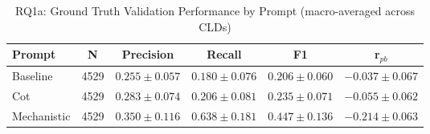 \begin{table}[htbp]
\centering
\caption{RQ1a: Ground Truth Validation Performance by Prompt (macro-averaged across CLDs)}
\label{tab:rq1a_gt_by_prompt}
\begin{tabular}{lccccc}
\toprule
\textbf{Prompt} & \textbf{N} & \textbf{Precision} & \textbf{Recall} & \textbf{F1} & \textbf{r$_{pb}$} \\
\midrule
Baseline & 4529 & $0.255 \pm 0.057$ & $0.180 \pm 0.076$ & $0.206 \pm 0.060$ & $-0.037 \pm 0.067$ \\
Cot & 4529 & $0.283 \pm 0.074$ & $0.206 \pm 0.081$ & $0.235 \pm 0.071$ & $-0.055 \pm 0.062$ \\
Mechanistic & 4529 & $0.350 \pm 0.116$ & $0.638 \pm 0.181$ & $0.447 \pm 0.136$ & $-0.214 \pm 0.063$ \\
\bottomrule
\end{tabular}
\end{table}